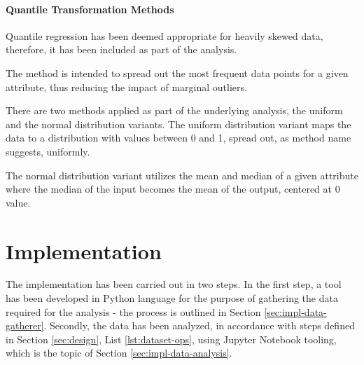 \paragraph{Quantile Transformation Methods} \label{sec:data-modelling:scalers:quantile}
Quantile regression has been deemed appropriate for heavily skewed data\cite{quantileNormalizationInSkewedDataAnalysis}, therefore, it has been included as part of the analysis.

The method is intended to spread out the most frequent data points for a given attribute, thus reducing the impact of marginal outliers.

There are two methods applied as part of the underlying analysis, the uniform and the normal distribution variants. The uniform distribution variant maps the data to a distribution with values between 0 and 1, spread out, as method name suggests, uniformly.

The normal distribution variant utilizes the mean and median of a given attribute where the median of the input becomes the mean of the output, centered at 0 value. 
\section{Implementation}\label{sec:implementation}
The implementation has been carried out in two steps. In the first step, a tool has been developed in Python language for the purpose of gathering the data required for the analysis - the process is outlined in Section \ref{sec:impl-data-gatherer}. Secondly, the data has been analyzed, in accordance with steps defined in Section \ref{sec:design}, List \ref{lst:dataset-ops}, using Jupyter Notebook tooling, which is the topic of Section \ref{sec:impl-data-analysis}.








